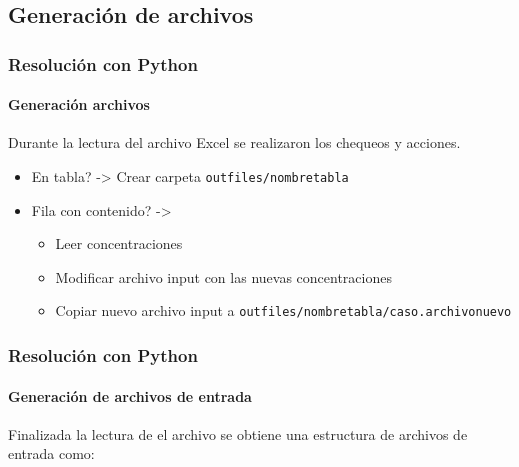 \documentclass[aspectratio=1610,multi,rgb]{beamer}
\begin{document}
\subsection{Generación de archivos}

\begin{frame}[c]
    \frametitle{Resolución con Python}
    \framesubtitle{Generación archivos}

    Durante la lectura del archivo Excel se realizaron los chequeos y acciones.
    
    \begin{itemize}
        \item En tabla? -> Crear carpeta \texttt{outfiles/nombretabla}
        \item Fila con contenido? ->
            \begin{itemize}
                \item Leer concentraciones
                \item Modificar archivo input con las nuevas concentraciones
                \item Copiar nuevo archivo input a \texttt{outfiles/nombretabla/caso.archivonuevo}
            \end{itemize}
    \end{itemize}

\end{frame}

\begin{frame}[c]
    \frametitle{Resolución con Python}
    \framesubtitle{Generación de archivos de entrada}
    
    Finalizada la lectura de el archivo se obtiene una estructura de archivos de entrada como:
\end{frame}
\end{document}
